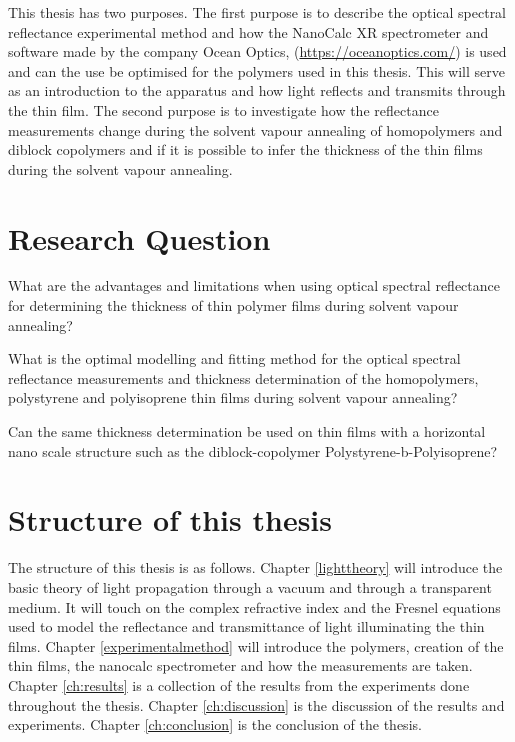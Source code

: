 \documentclass[MasterThesisMain.tex]{subfiles}
\begin{document}
This thesis has two purposes. The first purpose is to describe the optical spectral reflectance experimental method and how the NanoCalc XR spectrometer and software made by the company Ocean Optics, (\url{https://oceanoptics.com/}) is used and can the use be optimised for the polymers used in this thesis. This will serve as an introduction to the apparatus and how light reflects and transmits through the thin film. The second purpose is to investigate how the reflectance measurements change during the solvent vapour annealing of homopolymers and diblock copolymers and if it is possible to infer the thickness of the thin films during the solvent vapour annealing. 

\section{Research Question}
What are the advantages and limitations when using optical spectral reflectance for determining the thickness of thin polymer films during solvent vapour annealing?

What is the optimal modelling and fitting method for the optical spectral reflectance measurements and thickness determination of the homopolymers, polystyrene and polyisoprene thin films during solvent vapour annealing?  
		
Can the same thickness determination be used on thin films with a horizontal nano scale structure such as the diblock-copolymer Polystyrene-b-Polyisoprene?


\section{Structure of this thesis} 
The structure of this thesis is as follows. Chapter \ref{lighttheory} will introduce the basic theory of light propagation through a vacuum and through a transparent medium. It will touch on the complex refractive index and the Fresnel equations used to model the reflectance and transmittance of light illuminating the thin films. Chapter \ref{experimentalmethod} will introduce the polymers, creation of the thin films, the nanocalc spectrometer and how the measurements are taken.  Chapter \ref{ch:results} is a collection of the results from the experiments done throughout the thesis. Chapter \ref{ch:discussion} is the discussion of the results and experiments. Chapter \ref{ch:conclusion} is the conclusion of the thesis.

        
\end{document}
